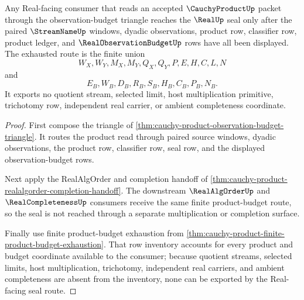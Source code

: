 \begin{theorem}
\label{thm:cauchy-product-budget-triangle-real-seal-exhaustion}
Any Real-facing consumer that reads an accepted $\CauchyProductUp$ packet through the observation-budget triangle reaches the $\RealUp$ seal only after the paired $\StreamNameUp$ windows, dyadic observations, product row, classifier row, product ledger, and $\RealObservationBudgetUp$ rows have all been displayed. The exhausted route is the finite union
$$
W_X,W_Y,M_X,M_Y,Q_X,Q_Y,P,E,H,C,L,N
$$
and
$$
E_B,W_B,D_B,R_B,S_B,H_B,C_B,P_B,N_B.
$$
It exports no quotient stream, selected limit, host multiplication primitive, trichotomy row, independent real carrier, or ambient completeness coordinate.
\end{theorem}
\begin{proof}
First compose the triangle of \autoref{thm:cauchy-product-observation-budget-triangle}. It routes the product read through paired source windows, dyadic observations, the product row, classifier row, seal row, and the displayed observation-budget rows.

Next apply the RealAlgOrder and completion handoff of \autoref{thm:cauchy-product-realalgorder-completion-handoff}. The downstream $\RealAlgOrderUp$ and $\RealCompletenessUp$ consumers receive the same finite product-budget route, so the seal is not reached through a separate multiplication or completion surface.

Finally use finite product-budget exhaustion from \autoref{thm:cauchy-product-finite-product-budget-exhaustion}. That row inventory accounts for every product and budget coordinate available to the consumer; because quotient streams, selected limits, host multiplication, trichotomy, independent real carriers, and ambient completeness are absent from the inventory, none can be exported by the Real-facing seal route.
\end{proof}


